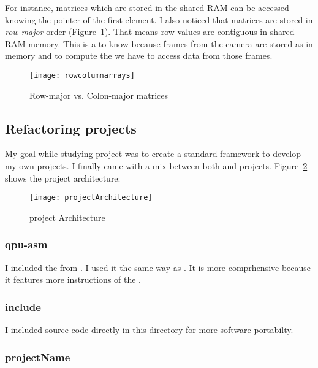 For instance, matrices which are stored in the shared RAM can be accessed knowing the pointer of the first element. I also noticed that matrices are stored in \emph{row-major} order (Figure~\ref{rowcolumnarrays}). That means row values are contiguous in shared RAM memory. This is a  to know because frames from the \rasp{} camera are stored as  in memory and to compute the  we have to access data from those frames.

\begin{figure}[!htbp]
	\centering
	\texttt{[image: rowcolumnarrays]}
	\caption{Row-major vs. Colon-major matrices}
	\label{rowcolumnarrays}
\end{figure}
\FloatBarrier


\subsection{Refactoring projects}

My goal while studying  project was to create a standard framework to develop my own projects. I finally came with a mix between both  and  projects. Figure~\ref{projectArchitectureFigure} shows the project architecture:

\begin{figure}[!htbp]
	\centering
	\texttt{[image: projectArchitecture]}
	\caption{project Architecture}
	\label{projectArchitectureFigure}
\end{figure}
\FloatBarrier

\subsubsection{qpu-asm}

I included the   from . I used it the same way as . It is more comprhensive because it features more instructions of the \vc.

\subsubsection{include}

I included  source code directly in this directory for more software portabilty.

\subsubsection{projectName}


